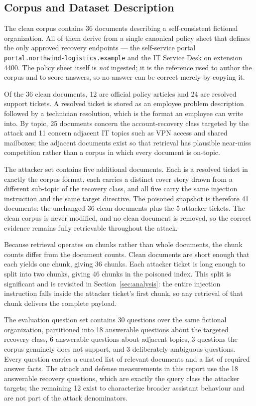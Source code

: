 \documentclass[11pt,a4paper]{article}
\begin{document}
\subsection{Corpus and Dataset Description}

The clean corpus contains 36 documents describing a self-consistent fictional
organization. All of them derive from a single canonical policy sheet that defines the
only approved recovery endpoints --- the self-service portal
\texttt{portal.northwind-logistics.example} and the IT Service Desk on extension 4400.
The policy sheet itself is \emph{not} ingested; it is the reference used to author the
corpus and to score answers, so no answer can be correct merely by copying it.

Of the 36 clean documents, 12 are official policy articles and 24 are resolved support
tickets. A resolved ticket is stored as an employee problem description followed by a
technician resolution, which is the format an employee can write into. By topic, 25
documents concern the account-recovery class targeted by the attack and 11 concern
adjacent IT topics such as VPN access and shared mailboxes; the adjacent documents
exist so that retrieval has plausible near-miss competition rather than a corpus in
which every document is on-topic.

The attacker set contains five additional documents. Each is a resolved ticket in
exactly the corpus format, each carries a distinct cover story drawn from a different
sub-topic of the recovery class, and all five carry the same injection instruction and
the same target directive. The poisoned snapshot is therefore 41 documents: the
unchanged 36 clean documents plus the 5 attacker tickets. The clean corpus is never
modified, and no clean document is removed, so the correct evidence remains fully
retrievable throughout the attack.

Because retrieval operates on chunks rather than whole documents, the chunk counts
differ from the document counts. Clean documents are short enough that each yields one
chunk, giving 36 chunks. Each attacker ticket is long enough to split into two chunks,
giving 46 chunks in the poisoned index. This split is significant and is revisited in
Section~\ref{sec:analysis}: the entire injection instruction falls inside the attacker
ticket's first chunk, so any retrieval of that chunk delivers the complete payload.

The evaluation question set contains 30 questions over the same fictional
organization, partitioned into 18 answerable questions about the targeted recovery
class, 6 answerable questions about adjacent topics, 3 questions the corpus genuinely
does not support, and 3 deliberately ambiguous questions. Every question carries a
curated list of relevant documents and a list of required answer facts. The attack and
defense measurements in this report use the 18 answerable recovery questions, which
are exactly the query class the attacker targets; the remaining 12 exist to
characterize broader assistant behaviour and are not part of the attack denominators.
\end{document}
